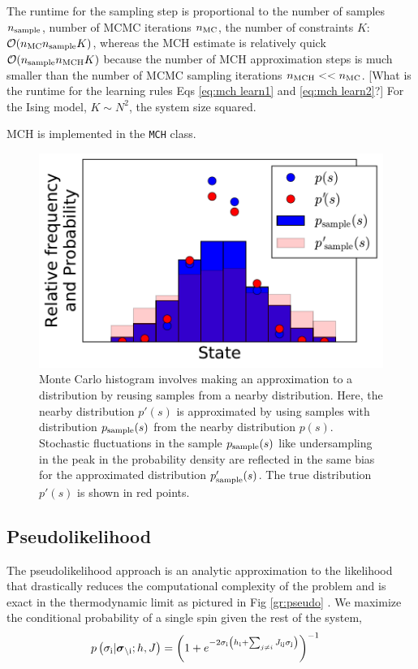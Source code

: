\documentclass[aps,prl,twocolumn]{revtex4-1}
\begin{document}
The runtime for the sampling step is proportional to the number of samples $n_{\rm sample}$, number of MCMC iterations $n_{\rm MC}$, the number of constraints $K$:
$\mathcal{O}(n_{\rm MC} n_{\rm sample} K)$, whereas the MCH estimate is relatively quick $\mathcal{O}(n_{\rm sample}n_{\rm MCH}K)$ because the number of MCH approximation steps is much smaller than the number of MCMC sampling iterations $n_{\rm MCH}<<n_{\rm MC}$. [What is the runtime for the learning rules Eqs \ref{eq:mch learn1} and \ref{eq:mch learn2}?]
For the Ising model, $K\sim N^2$, the system size squared.

MCH is implemented in the {\tt MCH} class.

\begin{figure}[tb]\centering
	\includegraphics[width=.85\linewidth]{images/mch}
\caption{Monte Carlo histogram involves making an approximation to a distribution by reusing samples from a nearby distribution. Here, the nearby distribution $p'(s)$ is approximated by using samples with distribution $p_{\rm sample}(s)$ from the nearby distribution $p(s)$. Stochastic fluctuations in the sample $p_{\rm sample}(s)$ like undersampling in the peak in the probability density are reflected in the same bias for the approximated distribution $p_{\rm sample}'(s)$. The true distribution $p'(s)$ is shown in red points.}
\label{gr:mch}
\end{figure}


\subsection{Pseudolikelihood}
The pseudolikelihood approach is an analytic approximation to the likelihood that drastically reduces the computational complexity of the problem and is exact in the thermodynamic limit as pictured in Fig \ref{gr:pseudo} \cite{Aurell:2012hi}. We maximize the conditional probability of a single spin given the rest of the system,
\begin{align}
	p\left(\sigma_{\rm i}|\boldsymbol{\sigma}_{\backslash \rm i};h,J\right) &= \left( 1+e^{-2\sigma_{\rm i} \left(h_{\rm i}+\sum_{j\neq i}J_{\rm ij}\sigma_{\rm j}\right)} \right)^{-1}
\end{align}
\end{document}
